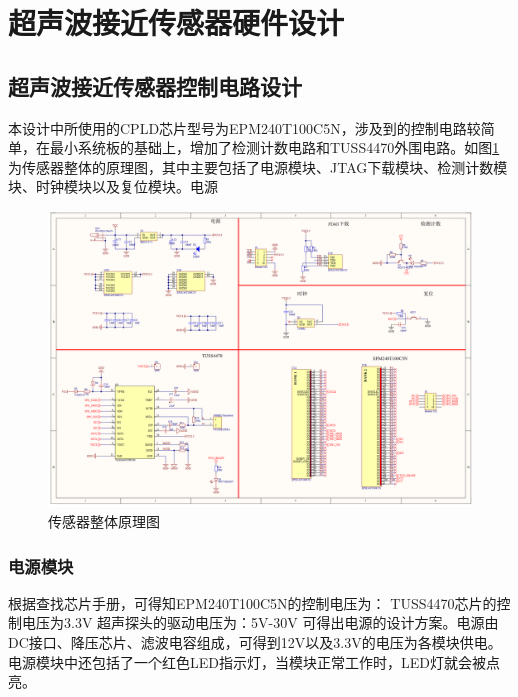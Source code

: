     \newpage
	\section{超声波接近传感器硬件设计}
	
    \subsection{超声波接近传感器控制电路设计}
    本设计中所使用的CPLD芯片型号为EPM240T100C5N，涉及到的控制电路较简单，在最小系统板的基础上，增加了检测计数电路和TUSS4470外围电路。如图\ref{传感器整体原理图}为传感器整体的原理图，其中主要包括了电源模块、JTAG下载模块、检测计数模块、时钟模块以及复位模块。电源
    \begin{figure}[ht]
        \centering
        \includegraphics[width=12cm]{figure/Overall circuit.png}
        \caption{传感器整体原理图}
        \label{传感器整体原理图}
    \end{figure}
    \subsubsection{电源模块}
      根据查找芯片手册，可得知EPM240T100C5N的控制电压为：
    TUSS4470芯片的控制电压为3.3V
    超声探头的驱动电压为：5V-30V
    可得出电源的设计方案。电源由DC接口、降压芯片、滤波电容组成，可得到12V以及3.3V的电压为各模块供电。电源模块中还包括了一个红色LED指示灯，当模块正常工作时，LED灯就会被点亮。
    
